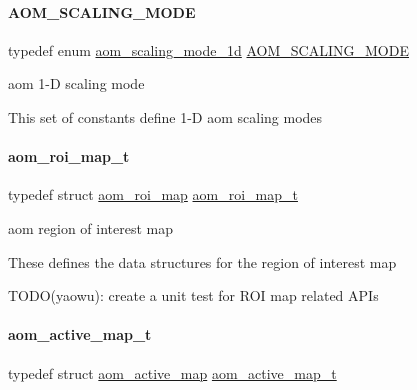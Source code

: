\paragraph{\texorpdfstring{A\+O\+M\+\_\+\+S\+C\+A\+L\+I\+N\+G\+\_\+\+M\+O\+DE}{AOM\_SCALING\_MODE}}
{\footnotesize\ttfamily typedef enum \hyperlink{group__aom__encoder_ga2a1791d26fca39303154f0f9ece3e295}{aom\+\_\+scaling\+\_\+mode\+\_\+1d}  \hyperlink{group__aom__encoder_ga6694eedd50b128415a3434404c56d73d}{A\+O\+M\+\_\+\+S\+C\+A\+L\+I\+N\+G\+\_\+\+M\+O\+DE}}



aom 1-\/D scaling mode 

This set of constants define 1-\/D aom scaling modes \mbox{\label{group__aom__encoder_gae682e0031e08270a2e0a60928305a830}} 
\paragraph{\texorpdfstring{aom\+\_\+roi\+\_\+map\+\_\+t}{aom\_roi\_map\_t}}
{\footnotesize\ttfamily typedef struct \hyperlink{structaom__roi__map}{aom\+\_\+roi\+\_\+map}  \hyperlink{group__aom__encoder_gae682e0031e08270a2e0a60928305a830}{aom\+\_\+roi\+\_\+map\+\_\+t}}



aom region of interest map 

These defines the data structures for the region of interest map

T\+O\+D\+O(yaowu)\+: create a unit test for R\+OI map related A\+P\+Is \mbox{\label{group__aom__encoder_gaaba582f3bd806cb3a0a6b8a66c1041e5}} 
\paragraph{\texorpdfstring{aom\+\_\+active\+\_\+map\+\_\+t}{aom\_active\_map\_t}}
{\footnotesize\ttfamily typedef struct \hyperlink{structaom__active__map}{aom\+\_\+active\+\_\+map}  \hyperlink{group__aom__encoder_gaaba582f3bd806cb3a0a6b8a66c1041e5}{aom\+\_\+active\+\_\+map\+\_\+t}}



